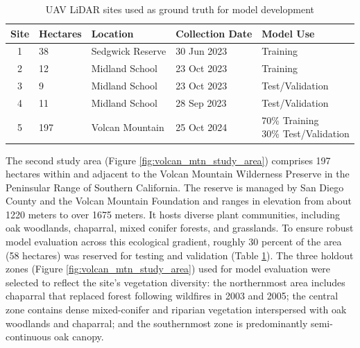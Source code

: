 \documentclass[remotesensing,article,submit,pdftex,moreauthors]{Definitions/mdpi}
\begin{document}
\begin{table}[H]
  \centering
  \caption{UAV LiDAR sites used as ground truth for model development}
  \label{tab:lidar_sites}
  \begin{tabular}{@{}cllll@{}}
    \toprule
    Site & Hectares & Location & Collection Date & Model Use \\ \midrule
    1 & 38  & Sedgwick Reserve & 30 Jun 2023 & Training \\
    2 & 12  & Midland School   & 23 Oct 2023 & Training \\
    3 &  9  & Midland School   & 23 Oct 2023 & Test/Validation \\
    4 & 11  & Midland School   & 28 Sep 2023 & Test/Validation \\
    5 & 197 & Volcan Mountain  & 25 Oct 2024 & 
        \makecell[l]{70\% Training\\ 30\% Test/Validation} \\
    \bottomrule
  \end{tabular}
\end{table}

The second study area (Figure \ref{fig:volcan_mtn_study_area}) comprises 197 hectares within and adjacent to the Volcan Mountain Wilderness Preserve in the Peninsular Range of Southern California. The reserve is managed by San Diego County and the Volcan Mountain Foundation and ranges in elevation from about 1220 meters to over 1675 meters.
 It hosts diverse plant communities, including oak woodlands, chaparral, mixed conifer forests, and grasslands.  To ensure robust model evaluation across this ecological gradient, roughly 30 percent of the area (58 hectares) was reserved for testing and validation (Table \ref{tab:lidar_sites}). The three holdout zones (Figure \ref{fig:volcan_mtn_study_area}) used for model evaluation were selected to reflect the site’s vegetation diversity: the northernmost area includes chaparral that replaced forest following wildfires in 2003 and 2005; the central zone contains dense mixed-conifer and riparian vegetation interspersed with oak woodlands and chaparral; and the southernmost zone is predominantly semi-continuous oak canopy. 
\end{document}
